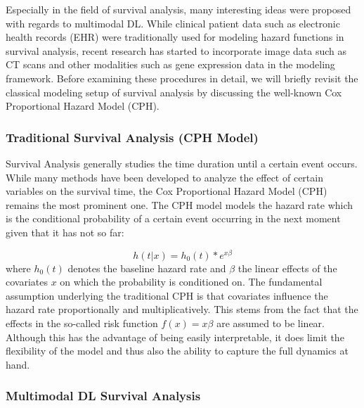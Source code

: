 \documentclass[
]{krantz}
\begin{document}
Especially in the field of survival analysis, many interesting ideas were proposed with regards to multimodal DL. While clinical patient data such as electronic health records (EHR) were traditionally used for modeling hazard functions in survival analysis, recent research has started to incorporate image data such as CT scans and other modalities such as gene expression data in the modeling framework. Before examining these procedures in detail, we will briefly revisit the classical modeling setup of survival analysis by discussing the well-known Cox Proportional Hazard Model (CPH).

\hypertarget{traditional-survival-analysis-cph-model}{%
\subsubsection{Traditional Survival Analysis (CPH Model)}\label{traditional-survival-analysis-cph-model}}

Survival Analysis generally studies the time duration until a certain event occurs. While many methods have been developed to analyze the effect
of certain variables on the survival time, the Cox Proportional Hazard Model (CPH) remains the most prominent one. The CPH model models the hazard rate which is the conditional probability of a certain event occurring in the next moment given that it has not so far:

\[
h(t|x) = h_0(t) * e^{x\beta}
\]
where \(h_0(t)\) denotes the baseline hazard rate and \(\beta\) the linear effects of the covariates \(x\) on which the probability is conditioned on. The fundamental assumption underlying the traditional CPH is that covariates influence the hazard rate proportionally and multiplicatively. This stems from the fact that the effects in the so-called risk function \(f(x) = x\beta\) are assumed to be linear. Although this has the advantage of being easily interpretable, it does limit the flexibility of the model and thus also the ability to capture the full dynamics at hand.

\hypertarget{multimodal-dl-survival-analysis}{%
\subsubsection{Multimodal DL Survival Analysis}\label{multimodal-dl-survival-analysis}}
\end{document}
